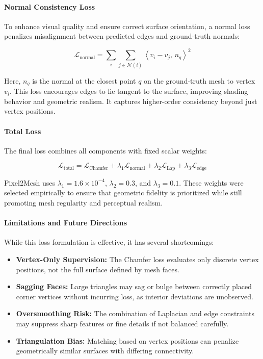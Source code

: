 \paragraph{Normal Consistency Loss}

To enhance visual quality and ensure correct surface orientation, a normal loss penalizes misalignment between predicted edges and ground-truth normals:

\[
\mathcal{L}_{\text{normal}} = \sum_i \sum_{j \in \mathcal{N}(i)} \left\langle v_i - v_j, \, n_q \right\rangle^2
\]

Here, \( n_q \) is the normal at the closest point \( q \) on the ground-truth mesh to vertex \( v_i \). This loss encourages edges to lie tangent to the surface, improving shading behavior and geometric realism. It captures higher-order consistency beyond just vertex positions.

\paragraph{Total Loss}

The final loss combines all components with fixed scalar weights:

\[
\mathcal{L}_{\text{total}} = \mathcal{L}_{\text{Chamfer}} + \lambda_1 \mathcal{L}_{\text{normal}} + \lambda_2 \mathcal{L}_{\text{Lap}} + \lambda_3 \mathcal{L}_{\text{edge}}
\]

Pixel2Mesh uses \(\lambda_1 = 1.6 \times 10^{-4}\), \(\lambda_2 = 0.3\), and \(\lambda_3 = 0.1\). These weights were selected empirically to ensure that geometric fidelity is prioritized while still promoting mesh regularity and perceptual realism.

\paragraph{Limitations and Future Directions}

While this loss formulation is effective, it has several shortcomings:
\begin{itemize}
    \item \textbf{Vertex-Only Supervision:} The Chamfer loss evaluates only discrete vertex positions, not the full surface defined by mesh faces.
    \item \textbf{Sagging Faces:} Large triangles may sag or bulge between correctly placed corner vertices without incurring loss, as interior deviations are unobserved.
    \item \textbf{Oversmoothing Risk:} The combination of Laplacian and edge constraints may suppress sharp features or fine details if not balanced carefully.
    \item \textbf{Triangulation Bias:} Matching based on vertex positions can penalize geometrically similar surfaces with differing connectivity.
\end{itemize}

